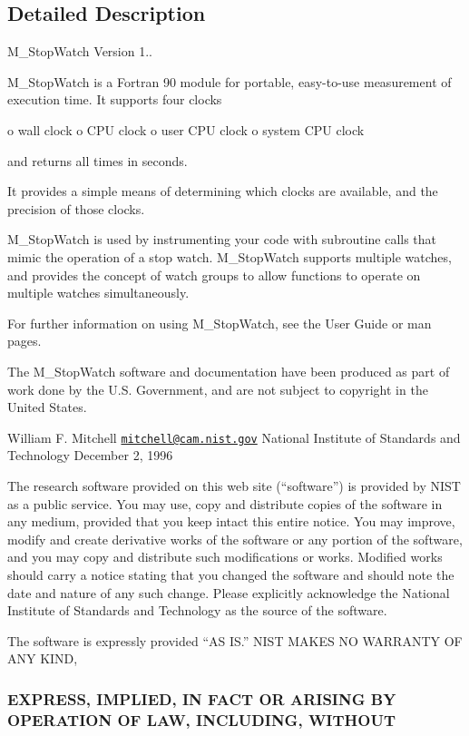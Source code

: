 \subsection{Detailed Description}
M\+\_\+\+Stop\+Watch Version 1.. 

M\+\_\+\+Stop\+Watch is a Fortran 90 module for portable, easy-\/to-\/use measurement of execution time. It supports four clocks

o wall clock o C\+PU clock o user C\+PU clock o system C\+PU clock

and returns all times in seconds.

It provides a simple means of determining which clocks are available, and the precision of those clocks.

M\+\_\+\+Stop\+Watch is used by instrumenting your code with subroutine calls that mimic the operation of a stop watch. M\+\_\+\+Stop\+Watch supports multiple watches, and provides the concept of watch groups to allow functions to operate on multiple watches simultaneously.

For further information on using M\+\_\+\+Stop\+Watch, see the User Guide or man pages.

The M\+\_\+\+Stop\+Watch software and documentation have been produced as part of work done by the U.\+S. Government, and are not subject to copyright in the United States.

William F. Mitchell \href{mailto:mitchell@cam.nist.gov}{\tt mitchell@cam.\+nist.\+gov} National Institute of Standards and Technology December 2, 1996

The research software provided on this web site (“software”) is provided by N\+I\+ST as a public service. You may use, copy and distribute copies of the software in any medium, provided that you keep intact this entire notice. You may improve, modify and create derivative works of the software or any portion of the software, and you may copy and distribute such modifications or works. Modified works should carry a notice stating that you changed the software and should note the date and nature of any such change. Please explicitly acknowledge the National Institute of Standards and Technology as the source of the software.

The software is expressly provided “\+AS I\+S.\+” N\+I\+ST M\+A\+K\+ES NO W\+A\+R\+R\+A\+N\+TY OF A\+NY K\+I\+ND, \subsubsection*{E\+X\+P\+R\+E\+SS, I\+M\+P\+L\+I\+ED, IN F\+A\+CT OR A\+R\+I\+S\+I\+NG BY O\+P\+E\+R\+A\+T\+I\+ON OF L\+AW, I\+N\+C\+L\+U\+D\+I\+NG, W\+I\+T\+H\+O\+UT}


